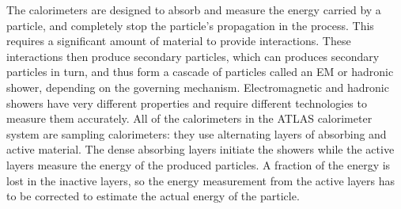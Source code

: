 
The calorimeters are designed to absorb and measure the energy carried by a particle, and completely stop the particle's propagation in the process.
This requires a significant amount of material to provide interactions.
These interactions then produce secondary particles, which can produces secondary particles in turn, and thus form a cascade of particles called an \ac{EM} or hadronic shower, depending on the governing mechanism.
Electromagnetic and hadronic showers have very different properties and require different technologies to measure them accurately.
All of the calorimeters in the ATLAS calorimeter system are sampling calorimeters: they use alternating layers of absorbing and active material.
The dense absorbing layers initiate the showers while the active layers measure the energy of the produced particles.
A fraction of the energy is lost in the inactive layers, so the energy measurement from the active layers has to be corrected to estimate the actual energy of the particle.

